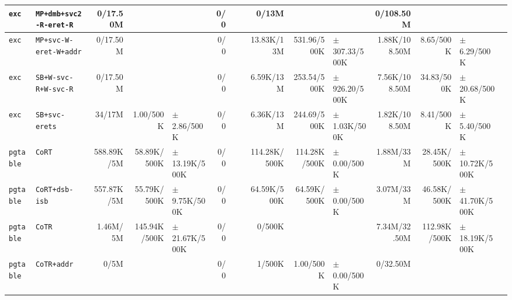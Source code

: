 \begin{tabular}{l l  | r r l | r r l | r r l | r r l l}
            \verb|exc| &                                \verb|MP+dmb+svc2-R-eret-R| &       0/17.50M &                       &                   &            0/0 &                       &  &          0/13M &                       &                   &      0/108.50M &                       &                   & \\ \hline 
            \verb|exc| &                                \verb|MP+svc-W-eret-W+addr| &       0/17.50M &                       &                   &            0/0 &                       &  &     13.83K/13M &           531.96/500K & $\pm$ 307.33/500K &  1.88K/108.50M &             8.65/500K &   $\pm$ 6.29/500K & \\ \hline 
            \verb|exc| &                                  \verb|SB+W-svc-R+W-svc-R| &       0/17.50M &                       &                   &            0/0 &                       &  &      6.59K/13M &           253.54/500K & $\pm$ 926.20/500K &  7.56K/108.50M &            34.83/500K &  $\pm$ 20.68/500K & \\ \hline 
            \verb|exc| &                                        \verb|SB+svc-erets| &         34/17M &             1.00/500K &   $\pm$ 2.86/500K &            0/0 &                       &  &      6.36K/13M &           244.69/500K &  $\pm$ 1.03K/500K &  1.82K/108.50M &             8.41/500K &   $\pm$ 5.40/500K & \\ \hline 
        \verb|pgtable| &                                                \verb|CoRT| &     588.89K/5M &           58.89K/500K & $\pm$ 13.19K/500K &            0/0 &                       &  &   114.28K/500K &          114.28K/500K &   $\pm$ 0.00/500K &      1.88M/33M &           28.45K/500K & $\pm$ 10.72K/500K & \\ \hline 
        \verb|pgtable| &                                        \verb|CoRT+dsb-isb| &     557.87K/5M &           55.79K/500K &  $\pm$ 9.75K/500K &            0/0 &                       &  &    64.59K/500K &           64.59K/500K &   $\pm$ 0.00/500K &      3.07M/33M &           46.58K/500K & $\pm$ 41.70K/500K & \\ \hline 
        \verb|pgtable| &                                                \verb|CoTR| &       1.46M/5M &          145.94K/500K & $\pm$ 21.67K/500K &            0/0 &                       &  &         0/500K &                       &                   &   7.34M/32.50M &          112.98K/500K & $\pm$ 18.19K/500K & \\ \hline 
        \verb|pgtable| &                                           \verb|CoTR+addr| &           0/5M &                       &                   &            0/0 &                       &  &         1/500K &             1.00/500K &   $\pm$ 0.00/500K &       0/32.50M &                       &                   & \\ \hline 

\end{tabular}
